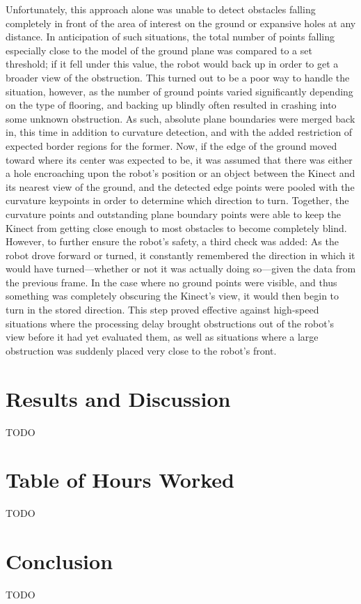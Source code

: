 \documentclass[12pt]{report}
\begin{document}
Unfortunately, this approach alone was unable to detect obstacles falling completely in front of the area of interest on the ground or expansive holes at any distance.  In anticipation of such situations, the total number of points falling especially close to the model of the ground plane was compared to a set threshold; if it fell under this value, the robot would back up in order to get a broader view of the obstruction.  This turned out to be a poor way to handle the situation, however, as the number of ground points varied significantly depending on the type of flooring, and backing up blindly often resulted in crashing into some unknown obstruction.  As such, absolute plane boundaries were merged back in, this time in addition to curvature detection, and with the added restriction of expected border regions for the former.  Now, if the edge of the ground moved toward where its center was expected to be, it was assumed that there was either a hole encroaching upon the robot's position or an object between the Kinect and its nearest view of the ground, and the detected edge points were pooled with the curvature keypoints in order to determine which direction to turn.
Together, the curvature points and outstanding plane boundary points were able to keep the Kinect from getting close enough to most obstacles to become completely blind.  However, to further ensure the robot's safety, a third check was added:  As the robot drove forward or turned, it constantly remembered the direction in which it would have turned---whether or not it was actually doing so---given the data from the previous frame.  In the case where no ground points were visible, and thus something was completely obscuring the Kinect's view, it would then begin to turn in the stored direction.  This step proved effective against high-speed situations where the processing delay brought obstructions out of the robot's view before it had yet evaluated them, as well as situations where a large obstruction was suddenly placed very close to the robot's front.

\section{Results and Discussion}
TODO

\section{Table of Hours Worked}
TODO

\section{Conclusion}
TODO
\end{document}
